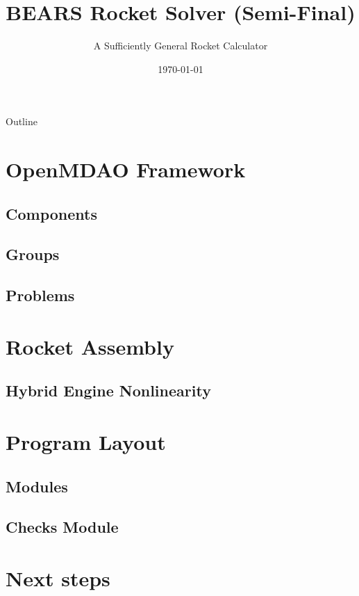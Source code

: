 \documentclass{beamer}
\title{BEARS Rocket Solver (Semi-Final)}
\subtitle{A Sufficiently General Rocket Calculator}
\date{\today}
\begin{document}
\begin{frame}
  \titlepage
\end{frame}

\begin{frame}{Outline}
  \tableofcontents
\end{frame}

\section{OpenMDAO Framework}


\subsection{Components}


\subsection{Groups}


\subsection{Problems}


\section{Rocket Assembly}


\subsection{Hybrid Engine Nonlinearity}


\section{Program Layout}


\subsection{Modules}


\subsection{Checks Module}


\section{Next steps}

\end{document}
